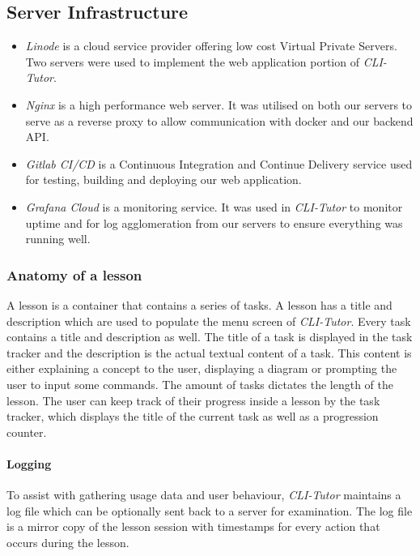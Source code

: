 \subsection{Server Infrastructure}
\begin{itemize}
    \item \textit{Linode} is a cloud service provider offering low cost Virtual Private Servers. Two servers were used to implement the web application portion of \textit{CLI-Tutor}.
    \item \textit{Nginx} is a high performance web server. It was utilised on
        both our servers to serve as a reverse proxy to allow communication
        with docker and our backend API.
    \item \textit{Gitlab CI/CD} is a Continuous Integration and Continue Delivery service used for testing, building and deploying our web application.
    \item \textit{Grafana Cloud} is a monitoring service. It was used in
        \textit{CLI-Tutor} to monitor uptime and for log agglomeration from our
        servers to ensure everything was running well.
\end{itemize}

\subsubsection{Anatomy of a lesson} A lesson is a container that contains a
series of tasks. A lesson has a title and description which are used to
populate the menu screen of \textit{CLI-Tutor}. Every task contains a title and
description as well. The title of a task is displayed in the task tracker and
the description is the actual textual content of a task. This content is either
explaining a concept to the user, displaying a diagram or prompting the user to
input some commands. The amount of tasks dictates the length of the lesson. The
user can keep track of their progress inside a lesson by the task tracker,
which displays the title of the current task as well as a progression counter.

\paragraph{Logging} To assist with gathering usage data and user behaviour,
\textit{CLI-Tutor} maintains a log file which can be optionally sent back to a
server for examination. The log file is a mirror copy of the lesson session
with timestamps for every action that occurs during the lesson.
